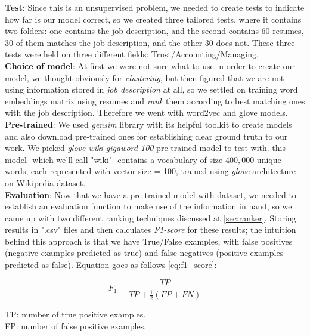 \textbf{Test}: Since this is an unsupervised problem, we needed to create tests to indicate how far is our model correct, so we created three tailored tests, where it contains two folders: one contains the job description, and the second contains 60 resumes, 30 of them matches the job description, and the other 30 does not. These three tests were held on three different fields: Trust/Accounting/Managing.\\

\textbf{Choice of model}: At first we were not sure what to use in order to create our model, we thought obviously for \textit{clustering}, but then figured that we are not using information stored in \textit{job description} at all, so we settled on training word embeddings matrix using resumes and \textit{rank} them according to best matching ones with the job description. Therefore we went with word2vec and glove models.\\

\textbf{Pre-trained}: We used \textit{gensim} library with its helpful toolkit to create models and also download pre-trained ones for establishing clear ground truth to our work. We picked \textit{glove-wiki-gigaword-100} pre-trained model to test with. this model -which we'll call "wiki"- contains a vocabulary of size $400,000$ unique words, each represented with vector size = 100, trained using \textit{glove} architecture on Wikipedia dataset.\\

\textbf{Evaluation}: Now that we have a pre-trained model with dataset, we needed to establish an evaluation function to make use of the information in hand, so we came up with two different ranking techniques discussed at \ref{sec:ranker}. Storing results in ".csv" files and then calculates \textit{F1-score} for these results; the intuition behind this approach is that we have True/False examples, with false positives (negative examples predicted as true) and false negatives (positive examples predicted as false). Equation goes as follows \ref{eq:f1_score}:

\begin{equation} \label{eq:f1_score}
F_1 = \frac{TP}{TP + \frac{1}{2}(FP + FN)}
\end{equation}


TP: number of true positive examples.\\

FP: number of false positive examples.\\

